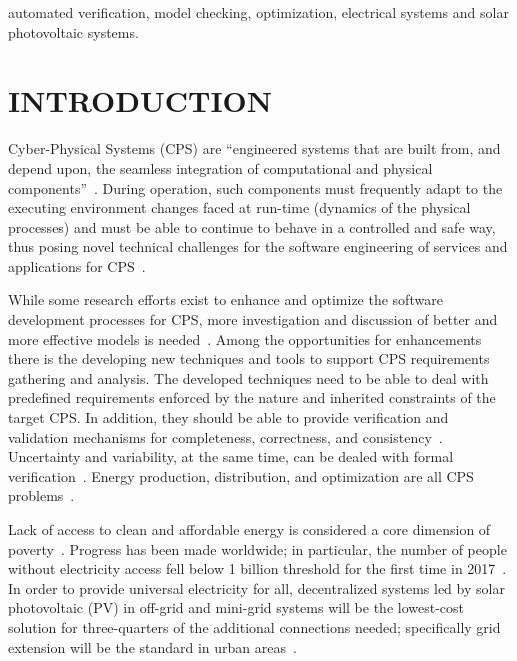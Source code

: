 \documentclass[10pt,conference]{IEEEtran}
\begin{document}
\begin{IEEEkeywords}
automated verification, model checking, optimization, electrical systems and solar photovoltaic systems.
\end{IEEEkeywords}

\section{INTRODUCTION}
Cyber-Physical  Systems  (CPS)  are  “engineered systems  that  are built from, and depend upon, the seamless integration of computational  and  physical  components”~\cite{NSF2015}. During operation, such components must frequently adapt to the executing environment changes faced at run-time (dynamics of the physical processes) and must be able to continue to behave in a controlled and safe way, thus posing novel technical challenges for the software engineering of services and applications for CPS~\cite{Metzger2014}. %

While some research efforts exist to enhance and optimize the software development processes for CPS, more investigation and discussion of better and more effective models is needed~\cite{Al-Jaroodi2016}. Among the opportunities for enhancements there is the developing new techniques and tools to support CPS requirements gathering and analysis. The developed techniques need to be able to deal with predefined requirements enforced by the nature and inherited constraints of the target CPS. In addition, they should be able to provide verification and validation mechanisms for completeness, correctness, and consistency~\cite{Al-Jaroodi2016}. Uncertainty and variability, at the same time, can be dealed with formal verification~\cite{NESSI}. Energy production, distribution, and optimization are all CPS problems~\cite{UC}. 

Lack of access to clean and affordable energy is considered a core dimension of poverty~\cite{Hussein2012}. Progress has been made worldwide; in particular, the number of people without electricity access fell below 1 billion threshold for the first time in 2017~\cite{IEAweo2018}. In order to provide universal electricity for all, decentralized systems led by solar photovoltaic (PV) in off-grid and mini-grid systems will be the lowest-cost solution for three-quarters of the additional connections needed; specifically grid extension will be the standard in urban areas~\cite{IEAweo2018}.
\end{document}
